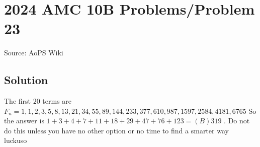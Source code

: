 \documentclass[12pt]{article}
\begin{document}
\section*{{2024 AMC 10B Problems/Problem 23}}
Source: AoPS Wiki

\subsection*{Solution}
The first $20$ terms are $F_n = 1, 1, 2, 3, 5, 8, 13, 21, 34, 55, 89, 144, 233, 377, 610, 987, 1597, 2584, 4181, 6765$ So the answer is $1 + 3 + 4 + 7 + 11 + 18 + 29 + 47 + 76 + 123 = \boxed{(B) 319}$ . Do not do this unless you have no other option or no time to find a smarter way ~ luckuso
\end{document}
